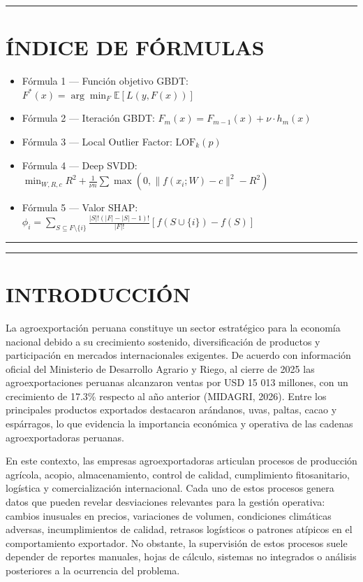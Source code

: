 \begin{center}\rule{0.5\linewidth}{0.5pt}\end{center}

\section{ÍNDICE DE FÓRMULAS}\label{uxedndice-de-fuxf3rmulas}

\begin{itemize}
\tightlist
\item
  Fórmula 1 --- Función objetivo GBDT:
  \(F^*(x) = \arg\min_F \mathbb{E}[L(y, F(x))]\)
\item
  Fórmula 2 --- Iteración GBDT:
  \(F_m(x) = F_{m-1}(x) + \nu \cdot h_m(x)\)
\item
  Fórmula 3 --- Local Outlier Factor: \(\text{LOF}_k(p)\)
\item
  Fórmula 4 --- Deep SVDD:
  \(\min_{W,R,c} R^2 + \frac{1}{\nu n}\sum \max(0, \|f(x_i;W)-c\|^2 - R^2)\)
\item
  Fórmula 5 --- Valor SHAP:
  \(\phi_i = \sum_{S \subseteq F \setminus \{i\}} \frac{|S|!(|F|-|S|-1)!}{|F|!}[f(S\cup\{i\})-f(S)]\)
\end{itemize}

\begin{center}\rule{0.5\linewidth}{0.5pt}\end{center}

\begin{center}\rule{0.5\linewidth}{0.5pt}\end{center}

\section{INTRODUCCIÓN}\label{introducciuxf3n}

La agroexportación peruana constituye un sector estratégico para la
economía nacional debido a su crecimiento sostenido, diversificación de
productos y participación en mercados internacionales exigentes. De
acuerdo con información oficial del Ministerio de Desarrollo Agrario y
Riego, al cierre de 2025 las agroexportaciones peruanas alcanzaron
ventas por USD 15 013 millones, con un crecimiento de 17.3\% respecto al
año anterior (MIDAGRI, 2026). Entre los principales productos exportados
destacaron arándanos, uvas, paltas, cacao y espárragos, lo que evidencia
la importancia económica y operativa de las cadenas agroexportadoras
peruanas.

En este contexto, las empresas agroexportadoras articulan procesos de
producción agrícola, acopio, almacenamiento, control de calidad,
cumplimiento fitosanitario, logística y comercialización internacional.
Cada uno de estos procesos genera datos que pueden revelar desviaciones
relevantes para la gestión operativa: cambios inusuales en precios,
variaciones de volumen, condiciones climáticas adversas, incumplimientos
de calidad, retrasos logísticos o patrones atípicos en el comportamiento
exportador. No obstante, la supervisión de estos procesos suele depender
de reportes manuales, hojas de cálculo, sistemas no integrados o
análisis posteriores a la ocurrencia del problema.

